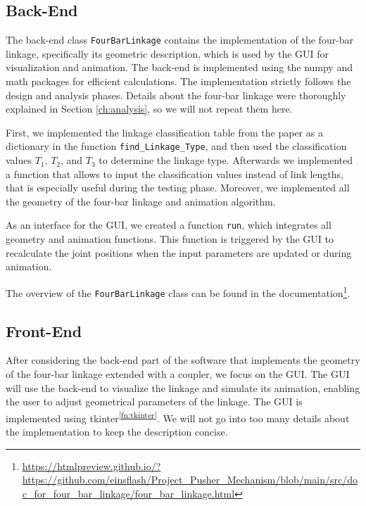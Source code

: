 \documentclass{article}
\begin{document}
\subsection{Back-End}
The back-end class \texttt{FourBarLinkage} contains the implementation of the four-bar linkage, specifically its geometric description, which is used by the GUI for visualization and animation. The back-end is implemented using the numpy and math packages for efficient calculations. The implementation strictly follows the design and analysis phases. Details about the four-bar linkage were thoroughly explained in Section \ref{ch:analysis}, so we will not repeat them here.

First, we implemented the linkage classification table from the paper \cite{inproceedings} as a dictionary in the function \texttt{find\_Linkage\_Type}, and then used the classification values $T_1$, $T_2$, and $T_3$ to determine the linkage type. Afterwards we implemented a function that allows to input the classification values instead of link lengths, that is especially useful during the testing phase. Moreover, we implemented all the geometry of the four-bar linkage and animation algorithm.

As an interface for the GUI, we created a function \texttt{run}, which integrates all geometry and animation functions. This function is triggered by the GUI to recalculate the joint positions when the input parameters are updated or during animation.

The overview of the \texttt{FourBarLinkage} class can be found in the documentation\footnote{\url{https://htmlpreview.github.io/?https://github.com/einsflash/Project_Pusher_Mechanism/blob/main/src/doc_for_four_bar_linkage/four_bar_linkage.html}}.

\subsection{Front-End}

After considering the back-end part of the software that implements the geometry of the four-bar linkage extended with a coupler, we focus on the GUI. The GUI will use the back-end to visualize the linkage and simulate its animation, enabling the user to adjust geometrical parameters of the linkage. The GUI is implemented using tkinter\textsuperscript{\ref{fn:tkinter}}. We will not go into too many details about the implementation to keep the description concise.
\end{document}
